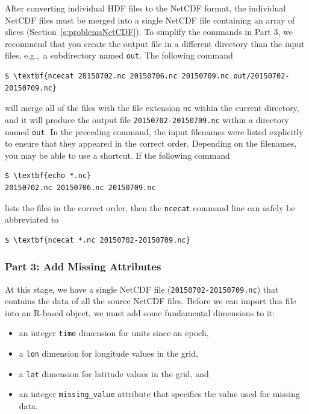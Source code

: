 \documentclass[11pt]{report}
\begin{document}
After converting individual HDF files to the NetCDF format, the individual NetCDF files must be merged into a single NetCDF file containing an array of slices (Section~\ref{s:problemsNetCDF}).
To simplify the commands in Part 3, we recommend that you create the output file in a different directory than the input files, e.g.,~a subdirectory named \texttt{out}.
The following command
\begin{Verbatim}[xleftmargin=.5in,commandchars=\\\{\}]
$ \textbf{ncecat 20150702.nc 20150706.nc 20150709.nc out/20150702-20150709.nc}
\end{Verbatim}
will merge all of the files with the file extension \texttt{nc} within the current directory, and it will produce the output file \texttt{20150702-20150709.nc} within a directory named \texttt{out}.
In the preceding command, the input filenames were listed explicitly to ensure that they appeared in the correct order.
Depending on the filenames, you may be able to use a shortcut.
If the following command
\begin{Verbatim}[xleftmargin=.5in,commandchars=\\\{\}]
$ \textbf{echo *.nc}
20150702.nc 20150706.nc 20150709.nc
\end{Verbatim}
lists the files in the correct order, then the \texttt{ncecat} command line can safely be abbreviated to
\begin{Verbatim}[xleftmargin=.5in,commandchars=\\\{\}]
$ \textbf{ncecat *.nc 20150702-20150709.nc}
\end{Verbatim}

\subsubsection{Part 3: Add Missing Attributes}
\label{ss:missingattr}

At this stage, we have a single NetCDF file (\texttt{20150702-20150709.nc}) that contains the data of all the source NetCDF files.
Before we can import this file into an R-based  object, we must add some fundamental dimensions to it:
\begin{itemize}
\item an integer \texttt{time} dimension for units since an epoch,
\item a \texttt{lon} dimension for longitude values in the grid,
\item a \texttt{lat} dimension for latitude values in the grid, and
\item an integer \texttt{missing\_value} attribute that specifies the value used for missing data.
\end{itemize}
\end{document}
